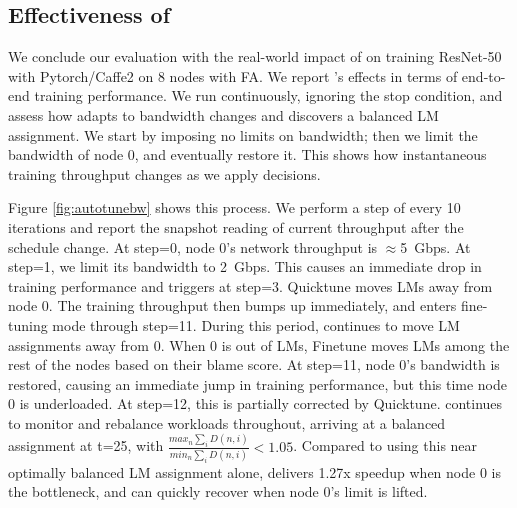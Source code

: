 


\subsection{Effectiveness of \autoplink}
We conclude our evaluation with the real-world impact of \autoplink on training ResNet-50 with Pytorch/Caffe2 on 8 nodes with FA. We report \autoplink's effects in terms of end-to-end training performance. We run \autoplink continuously, ignoring the stop condition, and assess how \autoplink adapts to bandwidth changes and discovers a balanced LM assignment. We start by imposing no limits on bandwidth; then we limit the bandwidth of node 0, and eventually restore it. This shows how instantaneous training throughput changes as we apply \autoplink decisions.

Figure \ref{fig:autotunebw} shows this process. We perform a step of \autoplink every 10 iterations and report the snapshot reading of current throughput after the schedule change. %
At step=0, node 0's network throughput is $\approx$5~Gbps. At step=1, we limit its bandwidth to 2~Gbps. This causes an immediate drop in training performance and triggers \autoplink at step=3. Quicktune moves LMs away from node 0. The training throughput then bumps up immediately, and \autoplink enters fine-tuning mode through step=11. During this period, \autoplink continues to move LM assignments away from 0. When 0 is out of LMs, Finetune moves LMs among the rest of the nodes based on their blame score. At step=11, node 0's bandwidth is restored, causing an immediate jump in training performance, but this time node 0 is underloaded. At step=12, this is partially corrected by Quicktune. \autoplink continues to monitor and rebalance workloads throughout, arriving at a balanced assignment at t=25, with $\frac{max_n\sum_{i}{D(n,i)}}{min_n\sum_{i}{D(n,i)}} < 1.05$. Compared to using this near optimally balanced LM assignment alone, \autoplink delivers 1.27x speedup when node 0 is the bottleneck, and can quickly recover when node 0's limit is lifted. 


